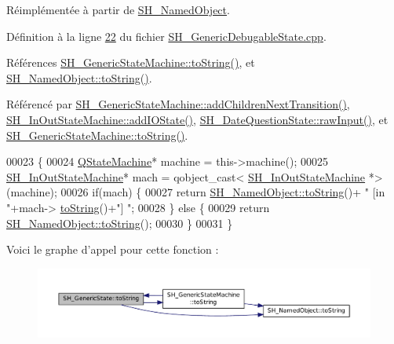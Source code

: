 Réimplémentée à partir de \hyperlink{classSH__NamedObject_a9f4b19df6a96a17daaf1060b3019ef47}{S\-H\-\_\-\-Named\-Object}.



Définition à la ligne \hyperlink{SH__GenericDebugableState_8cpp_source_l00022}{22} du fichier \hyperlink{SH__GenericDebugableState_8cpp_source}{S\-H\-\_\-\-Generic\-Debugable\-State.\-cpp}.



Références \hyperlink{classSH__GenericStateMachine_a85c0c1c9d258ae991f84667412fa47cd}{S\-H\-\_\-\-Generic\-State\-Machine\-::to\-String()}, et \hyperlink{classSH__NamedObject_a9f4b19df6a96a17daaf1060b3019ef47}{S\-H\-\_\-\-Named\-Object\-::to\-String()}.



Référencé par \hyperlink{classSH__GenericStateMachine_a16d844020bc26480bd81d6b794c8364c}{S\-H\-\_\-\-Generic\-State\-Machine\-::add\-Children\-Next\-Transition()}, \hyperlink{classSH__InOutStateMachine_a2528cffddbe6f98c32ebef41423c0118}{S\-H\-\_\-\-In\-Out\-State\-Machine\-::add\-I\-O\-State()}, \hyperlink{classSH__DateQuestionState_a71917e94cb9ce692f916a848bc8c8892}{S\-H\-\_\-\-Date\-Question\-State\-::raw\-Input()}, et \hyperlink{classSH__GenericStateMachine_a85c0c1c9d258ae991f84667412fa47cd}{S\-H\-\_\-\-Generic\-State\-Machine\-::to\-String()}.


\begin{DoxyCode}
00023 \{
00024     \hyperlink{classQStateMachine}{QStateMachine}* machine = this->machine();
00025     \hyperlink{classSH__InOutStateMachine}{SH\_InOutStateMachine}* mach = qobject\_cast<
      \hyperlink{classSH__InOutStateMachine}{SH\_InOutStateMachine} *>(machine);
00026     \textcolor{keywordflow}{if}(mach) \{
00027         \textcolor{keywordflow}{return} \hyperlink{classSH__NamedObject_a9f4b19df6a96a17daaf1060b3019ef47}{SH\_NamedObject::toString}()+ \textcolor{stringliteral}{" [in "}+mach->
      \hyperlink{classSH__GenericStateMachine_a85c0c1c9d258ae991f84667412fa47cd}{toString}()+\textcolor{stringliteral}{"] "};
00028     \} \textcolor{keywordflow}{else} \{
00029         \textcolor{keywordflow}{return} \hyperlink{classSH__NamedObject_a9f4b19df6a96a17daaf1060b3019ef47}{SH\_NamedObject::toString}();
00030     \}
00031 \}
\end{DoxyCode}


Voici le graphe d'appel pour cette fonction \-:\nopagebreak
\begin{figure}[H]
\begin{center}
\leavevmode
\includegraphics[width=350pt]{classSH__GenericState_a7779babbb40f3f8faa71112204d9804f_cgraph}
\end{center}
\end{figure}




